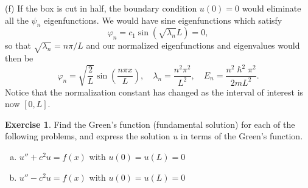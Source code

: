 \documentclass[12pt]{article}
\renewcommand{\phi}{\varphi}
\theoremstyle{definition}
\newtheorem{exer}{Exercise}
\theoremstyle{remark}
\begin{document}
  (f) If the box is cut in half, the boundary condition $u(0) = 0$ would eliminate all the $\psi_{n}$ eigenfunctions. We would have sine eigenfunctions which satisfy 
  \begin{equation*}
      \phi_{n} = c_{1} \sin (\sqrt{\lambda_{n}} L) = 0,
  \end{equation*}
  so that $ \sqrt{\lambda_{n}} = n\pi / L$ and our normalized eigenfunctions and eigenvalues would then be
  \begin{equation*}
      \phi_{n} = \sqrt{\frac{2}{L}} \sin \left( \frac{n\pi x}{L} \right), \quad \lambda_{n} = \frac{n^{2}\pi^{2}}{L^{2}} , \quad E_{n} = \frac{n^{2}\hslash^{2}\pi^{2}}{2mL^{2}}.
  \end{equation*}
  Notice that the normalization constant has changed as the interval of interest is now $[0,L]$.

\newpage


\begin{exer}
Find the Green’s function (fundamental solution) for each of the following problems, and express the solution $u$ in terms of the Green’s function.
\begin{enumerate}[(a)]
    \item $u'' + c^{2}u = f(x)$ with $u(0) = u(L) = 0$
    \item $u'' - c^{2} u = f(x)$ with $u(0) = u(L) = 0$
\end{enumerate}
\end{exer}
\end{document}
